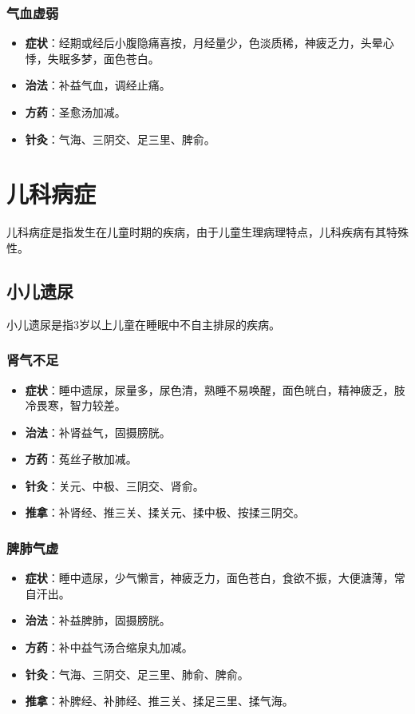\documentclass[12pt,UTF8]{ctexbook}
\begin{document}
\subsubsection{气血虚弱}

\begin{itemize}
\item \textbf{症状}：经期或经后小腹隐痛喜按，月经量少，色淡质稀，神疲乏力，头晕心悸，失眠多梦，面色苍白。
\item \textbf{治法}：补益气血，调经止痛。
\item \textbf{方药}：圣愈汤加减。
\item \textbf{针灸}：气海、三阴交、足三里、脾俞。
\end{itemize}

\section{儿科病症}

儿科病症是指发生在儿童时期的疾病，由于儿童生理病理特点，儿科疾病有其特殊性。

\subsection{小儿遗尿}

小儿遗尿是指3岁以上儿童在睡眠中不自主排尿的疾病。

\subsubsection{肾气不足}

\begin{itemize}
\item \textbf{症状}：睡中遗尿，尿量多，尿色清，熟睡不易唤醒，面色㿠白，精神疲乏，肢冷畏寒，智力较差。
\item \textbf{治法}：补肾益气，固摄膀胱。
\item \textbf{方药}：菟丝子散加减。
\item \textbf{针灸}：关元、中极、三阴交、肾俞。
\item \textbf{推拿}：补肾经、推三关、揉关元、揉中极、按揉三阴交。
\end{itemize}

\subsubsection{脾肺气虚}

\begin{itemize}
\item \textbf{症状}：睡中遗尿，少气懒言，神疲乏力，面色苍白，食欲不振，大便溏薄，常自汗出。
\item \textbf{治法}：补益脾肺，固摄膀胱。
\item \textbf{方药}：补中益气汤合缩泉丸加减。
\item \textbf{针灸}：气海、三阴交、足三里、肺俞、脾俞。
\item \textbf{推拿}：补脾经、补肺经、推三关、揉足三里、揉气海。
\end{itemize}
\end{document}
